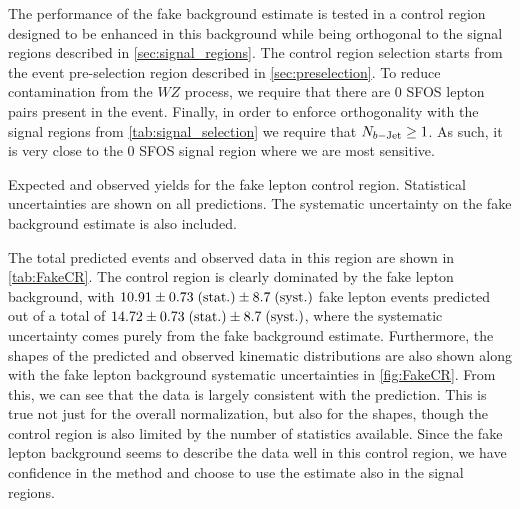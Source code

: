 



The performance of the fake background estimate is tested in a control region
designed to be enhanced in this background while being orthogonal to the signal regions
described in \sec\ref{sec:signal_regions}.
The control region selection starts from the event pre-selection region described 
in \sec\ref{sec:preselection}. To reduce contamination 
from the $WZ$ process, we require that there are 0 SFOS 
lepton pairs present in the event.
Finally, in order to enforce 
orthogonality with the signal regions
from \tab\ref{tab:signal_selection}
we require that $N_{b-\textrm{Jet}} \geq 1$. 
As such, it is very close to the 0 SFOS signal region where we are most sensitive.

\begin{table}[ht!]
\centering

\caption{Expected and observed yields for the fake lepton control region. 
Statistical uncertainties are shown on all predictions. The systematic
uncertainty on the fake background estimate is also included.}
\label{tab:FakeCR}
\end{table}




The total predicted events and observed data in this region are shown in \tab\ref{tab:FakeCR}.
The control region is clearly dominated by the fake lepton background, with $10.91 \pm 0.73\mbox{$\;$(stat.)} \pm 8.7 \mbox{$\;$(syst.)}$ 
fake lepton events predicted out of a total of $14.72 \pm 0.73\mbox{$\;$(stat.)} \pm 8.7 \mbox{$\;$(syst.)}$,
where the systematic uncertainty comes purely from the fake background
estimate. Furthermore, the shapes
of the predicted and observed kinematic distributions are also shown along with the
fake lepton background systematic uncertainties in \fig\ref{fig:FakeCR}.  From this, 
we can see that the data is largely consistent with the prediction. This is true not just
for the overall normalization, but also for the shapes, though the control region is also 
limited by the number of statistics available. Since the fake lepton background
seems to describe the data well in this control region, we have confidence in the method
and choose to use the estimate also in the signal regions. 



